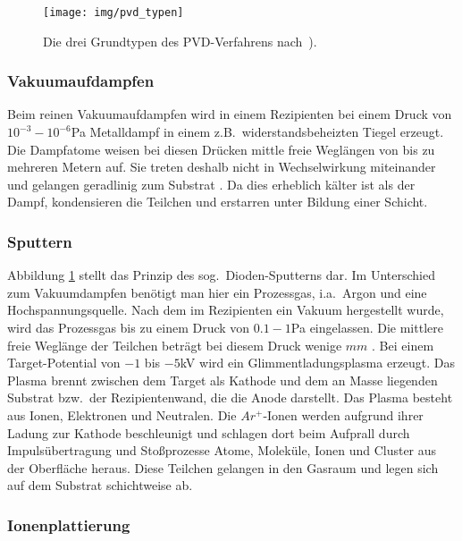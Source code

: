 \documentclass[12pt,a4paper,bibliography=totocnumbered,listof=totocnumbered,fleqn]{scrartcl}
\begin{document}
\begin{figure}[h!]
\centering
\texttt{[image: img/pvd\_typen]}
\caption{Die drei Grundtypen des PVD-Verfahrens nach~\citep{bach2005moderne}).}
\label{fig:grundtypen_pvd}
\end{figure}

\subsubsection{Vakuumaufdampfen}

Beim reinen Vakuumaufdampfen wird in einem Rezipienten bei einem Druck von $10^{-3} - 10^{-6}$Pa Metalldampf in einem z.B.\ widerstandsbeheizten Tiegel erzeugt.
Die Dampfatome weisen bei diesen Drücken mittle freie Weglängen von bis zu mehreren Metern auf.
Sie treten deshalb nicht in Wechselwirkung miteinander und gelangen geradlinig zum Substrat \citep{bach2005moderne}.
Da dies erheblich kälter ist als der Dampf, kondensieren die Teilchen und erstarren unter Bildung einer Schicht.

\subsubsection{Sputtern}

Abbildung \ref{fig:grundtypen_pvd} stellt das Prinzip des sog.\ Dioden-Sputterns dar.
Im Unterschied zum Vakuumdampfen benötigt man hier ein Prozessgas, i.a.\ Argon und eine Hochspannungsquelle.
Nach dem im Rezipienten ein Vakuum hergestellt wurde, wird das Prozessgas bis zu einem Druck von $0.1 - 1$Pa eingelassen.
Die mittlere freie Weglänge der Teilchen beträgt bei diesem Druck wenige $mm$ \citep{bobzin2013oberflchentechnik}.
Bei einem Target-Potential von $-1$ bis $-5$kV wird ein Glimmentladungsplasma erzeugt.
Das Plasma brennt zwischen dem Target als Kathode und dem an Masse liegenden Substrat bzw.\ der Rezipientenwand, die die Anode darstellt.
Das Plasma besteht aus Ionen, Elektronen und Neutralen.
Die $Ar^{+}$-Ionen werden aufgrund ihrer Ladung zur Kathode beschleunigt und schlagen dort beim Aufprall durch Impulsübertragung und Stoßprozesse Atome, Moleküle, Ionen und Cluster aus der Oberfläche heraus.
Diese Teilchen gelangen in den Gasraum und legen sich auf dem Substrat schichtweise ab.

\subsubsection{Ionenplattierung}
\end{document}
